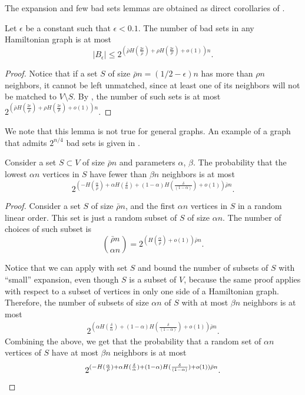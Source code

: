 The expansion and few bad sets lemmas are obtained as direct corollaries of .

%
\begin{lemma}
	Let $\epsilon$ be a constant such that $\epsilon<0.1$. The number of bad sets in any Hamiltonian graph is at most
	$$|B_\epsilon|\leq  2^{\left(\bar{\rho} H(\frac{2\epsilon}{\bar{\rho}})+\rho H(\frac{2\epsilon} {\rho})+o(1)\right)n}.$$ \label{lem:ham_bad_sets}
\end{lemma}
\begin{proof}
	Notice that if a set $S$ of size 
%
$\bar{\rho} n = (1/2-\epsilon)n$   %
has more than $\rho n$ neighbors, it cannot be left unmatched, since at least one of its neighbors will not be matched to $V\setminus S$. 
%
%
%
%
By , the number of such sets is at most $2^{\left(\bar{\rho} H(\frac{2\epsilon}{\bar{\rho}})+\rho H(\frac{2\epsilon} {\rho})+o(1)\right)n}.$
\end{proof}

We note that this lemma is not true for general graphs.
An example of a graph that admits $2^{n/4}$ bad sets is given in .

\begin{lemma}
	Consider a set $S\subset V$ of size $\bar{\rho} n$ and parameters $\alpha$, $\beta$. The probability that the lowest $\alpha n$ vertices in $S$ have
%
fewer  %
than $\beta n$ neighbors is at most
	$$2^{\left(-H(\frac{\alpha}{\bar{\rho}})+\alpha H(\frac{\delta}{ \alpha})+(1-\alpha)H(\frac{\delta} {(1-\alpha)})+o(1)\right)\bar{\rho}n}.$$   \label{lem:ham_expansion}	
\end{lemma}
\begin{proof}
	Consider a set $S$ of size $\bar{\rho} n$, and the first $\alpha n$ vertices in $S$ in a random linear order. This set is just a random subset of $S$ of size $\alpha n$. The number of choices of such subset is $$\binom{\bar{\rho}n}{\alpha n} = 2^{(H(\frac{\alpha}{\bar{\rho}})+o(1))\bar{\rho} n}.$$

Notice that we can apply  
 with set $S$ and bound the number of subsets of $S$ with ``small'' expansion, 
%
%
%
%
even though $S$ is a subset of $V$, because the same proof applies
%
%
with respect to a subset of vertices in only %
one side of a Hamiltonian graph. Therefore, the number of subsets of size $\alpha n$ of $S$ with at most $\beta n$ neighbors is at most
	\begin{eqnarray*}
		2^{(\alpha H(\frac{\delta}{ \alpha})+(1-\alpha)H(\frac{\delta} {(1-\alpha)})+o(1))\bar{\rho}n}.
	\end{eqnarray*}
	Combining the above, we get that the probability that a random set of $\alpha n$ vertices of $S$ have at most $\beta n$ neighbors is at most
	\begin{eqnarray*}
2^{(-H(\frac{\alpha}{\bar{\rho}})+\alpha H(\frac{\delta}{ \alpha})+(1-\alpha)H(\frac{\delta} {(1-\alpha)})+o(1))\bar{\rho}n}.     \qedhere
	\end{eqnarray*}          
\end{proof}

